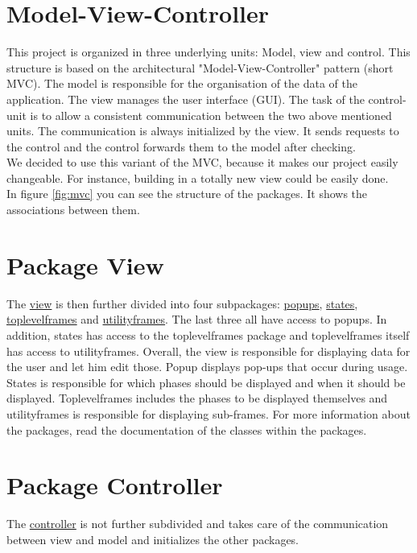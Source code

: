 \documentclass[letterpaper,10pt,english]{sphinxmanual}
\begin{document}
\section{Model-View-Controller} \label{sec::mvc}
This project is organized in three underlying units: Model, view and control. This structure is based on the architectural "Model-View-Controller" pattern (short MVC). 
The model is responsible for the organisation of the data of the application. The view manages the user interface (GUI). The task of the control-unit is to allow a consistent communication between the two above mentioned units. The communication is always initialized by the view. It sends requests to the control and the control forwards them to the model after checking.\\
We decided to use this variant of the MVC, because it makes our project easily changeable. For instance, building in a totally new view could be easily done.\\
In figure \ref{fig:mvc} you can see the structure of the packages. It shows the associations between them.


\section{Package View}
The \hyperref[fig:view]{view} is then further divided into four subpackages: \hyperref[fig:popups]{popups}, \hyperref[fig:states]{states}, \hyperref[fig:toplevelframes]{toplevelframes} and \hyperref[fig:utilityframes]{utilityframes}. The last three all have access to popups. In addition, states has access to the toplevelframes package and toplevelframes itself has access to utilityframes. Overall, the view is responsible for displaying data for the user and let him edit those. Popup displays pop-ups that occur during usage. States is responsible for which phases should be displayed and when it should be displayed. Toplevelframes includes the phases to be displayed themselves and utilityframes is responsible for displaying sub-frames. For more information about the packages, read the documentation of the classes within the packages.

\section{Package Controller}
The \hyperref[fig:controller]{controller} is not further subdivided and takes care of the communication between view and model and initializes the other packages.
\end{document}
